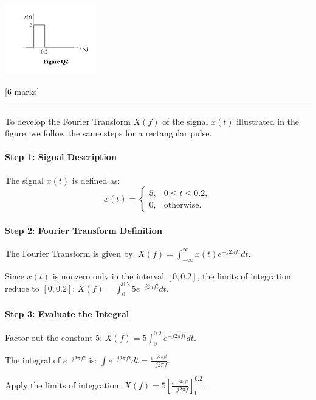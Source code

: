 \documentclass[11pt]{article}
\begin{document}
\includegraphics[width=0.3\textwidth]{images/Figure-Q2.png}

{[}6 marks{]}

    \begin{center}\rule{0.5\linewidth}{0.5pt}\end{center}

To develop the Fourier Transform \(X(f)\) of the signal \(x(t)\)
illustrated in the figure, we follow the same steps for a rectangular
pulse.

\paragraph{Step 1: Signal Description}\label{step-1-signal-description}

The signal \(x(t)\) is defined as: \[
x(t) =
\begin{cases} 
5, & 0 \leq t \leq 0.2, \\
0, & \text{otherwise}.
\end{cases}
\]

\paragraph{Step 2: Fourier Transform
Definition}\label{step-2-fourier-transform-definition}

The Fourier Transform is given by:
\(X(f) = \int_{-\infty}^\infty x(t) e^{-j 2 \pi f t} dt.\)

Since \(x(t)\) is nonzero only in the interval \([0, 0.2]\), the limits
of integration reduce to \([0, 0.2]\):
\(X(f) = \int_0^{0.2} 5 e^{-j 2 \pi f t} dt.\)

\paragraph{Step 3: Evaluate the
Integral}\label{step-3-evaluate-the-integral}

Factor out the constant \(5\):
\(X(f) = 5 \int_0^{0.2} e^{-j 2 \pi f t} dt.\)

The integral of \(e^{-j 2 \pi f t}\) is:
\(\int e^{-j 2 \pi f t} dt = \frac{e^{-j 2 \pi f t}}{-j 2 \pi f}.\)

Apply the limits of integration:
\(X(f) = 5 \left[ \frac{e^{-j 2 \pi f t}}{-j 2 \pi f} \right]_0^{0.2}.\)
\end{document}
